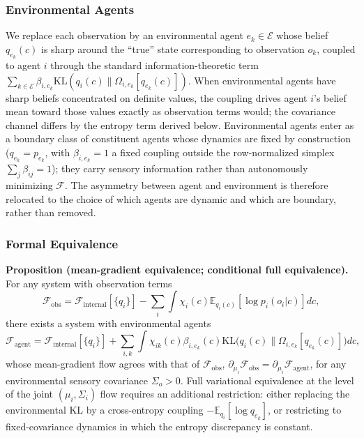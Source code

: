 \documentclass[11pt]{article}
\begin{document}
\subsubsection{Environmental Agents}

We replace each observation by an environmental agent $e_k \in \mathcal{E}$ whose belief $q_{e_k}(c)$ is sharp around the ``true'' state corresponding to observation $o_k$, coupled to agent $i$ through the standard information-theoretic term $\sum_{k \in \mathcal{E}} \beta_{i,e_k}  \mathrm{KL}(q_i(c) \| \Omega_{i,e_k}[q_{e_k}(c)])$. When environmental agents have sharp beliefs concentrated on definite values, the coupling drives agent $i$'s belief mean toward those values exactly as observation terms would; the covariance channel differs by the entropy term derived below. Environmental agents enter as a boundary class of constituent agents whose dynamics are fixed by construction ($q_{e_k} = p_{e_k}$, with $\beta_{i,e_k} = 1$ a fixed coupling outside the row-normalized simplex $\sum_j \beta_{ij} = 1$); they carry sensory information rather than autonomously minimizing $\mathcal{F}$. The asymmetry between agent and environment is therefore relocated to the choice of which agents are dynamic and which are boundary, rather than removed.

\subsubsection{Formal Equivalence}

\textbf{Proposition (mean-gradient equivalence; conditional full equivalence).} For any system with observation terms
\begin{equation}
\mathcal{F}_{\text{obs}} = \mathcal{F}_{\text{internal}}[\{q_i\}] - \sum_i \int \chi_i(c)  \mathbb{E}_{q_i(c)}[\log p_i(o_i|c)]  dc,
\end{equation}
there exists a system with environmental agents
\begin{equation}
\mathcal{F}_{\text{agent}} = \mathcal{F}_{\text{internal}}[\{q_i\}] + \sum_{i,k} \int \chi_{ik}(c)  \beta_{i,e_k}(c)  \mathrm{KL}\big(q_i(c) \| \Omega_{i,e_k}[q_{e_k}(c)]\big)  dc,
\end{equation}
whose mean-gradient flow agrees with that of $\mathcal{F}_{\text{obs}}$, $\partial_{\mu_i}\mathcal{F}_{\text{obs}} = \partial_{\mu_i}\mathcal{F}_{\text{agent}}$, for any environmental sensory covariance $\Sigma_o > 0$. Full variational equivalence at the level of the joint $(\mu_i, \Sigma_i)$ flow requires an additional restriction: either replacing the environmental KL by a cross-entropy coupling $-\mathbb{E}_{q_i}[\log q_{e_k}]$, or restricting to fixed-covariance dynamics in which the entropy discrepancy is constant.
\end{document}
